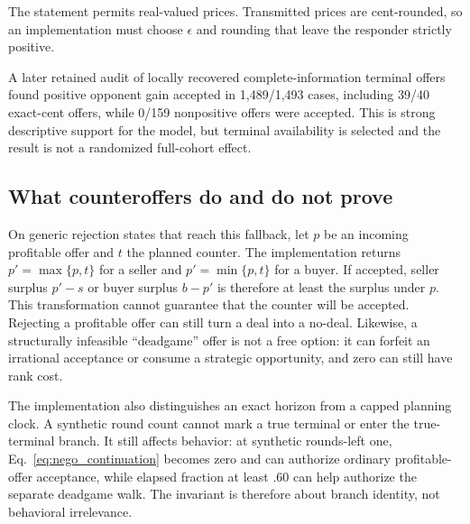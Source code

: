 The statement permits real-valued prices. Transmitted prices are cent-rounded,
so an implementation must choose $\epsilon$ and rounding that leave the
responder strictly positive.

A later retained audit of locally recovered complete-information terminal
offers found positive opponent gain accepted in 1,489/1,493 cases, including
39/40 exact-cent offers, while 0/159 nonpositive offers were accepted. This is
strong descriptive support for the model, but
terminal availability is selected and the result is not a randomized
full-cohort effect.

\subsection{What counteroffers do and do not prove}

On generic rejection states that reach this fallback, let $p$ be an incoming
profitable offer and $t$ the planned counter. The implementation returns
$p'=\max\{p,t\}$ for a seller and
$p'=\min\{p,t\}$ for a buyer. If accepted, seller surplus $p'-s$ or buyer
surplus $b-p'$ is therefore at least the surplus under $p$. This transformation
cannot
guarantee that the counter will be accepted. Rejecting a profitable offer can
still turn a deal into a no-deal. Likewise, a structurally infeasible
``deadgame'' offer is not a free option: it can forfeit an irrational acceptance
or consume a strategic opportunity, and zero can still have rank cost.

The implementation also distinguishes an exact horizon from a capped planning
clock. A synthetic round count cannot mark a true terminal or enter the
true-terminal branch. It still affects behavior: at synthetic rounds-left one,
Eq.~\eqref{eq:nego_continuation} becomes zero and can authorize ordinary
profitable-offer acceptance, while elapsed fraction at least $.60$ can help
authorize the separate deadgame walk. The invariant is therefore about branch
identity, not behavioral irrelevance.

